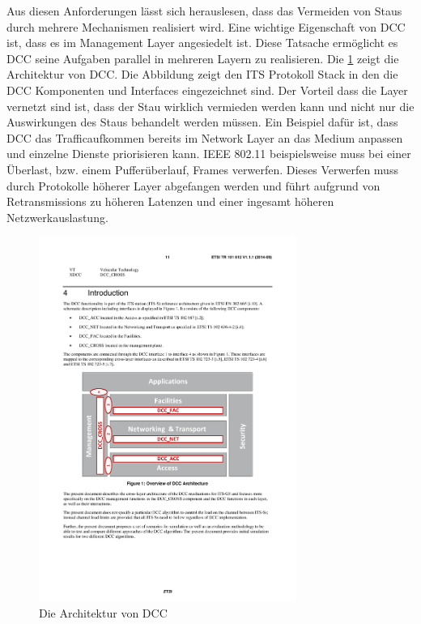 Aus diesen Anforderungen lässt sich herauslesen, dass das Vermeiden von Staus durch mehrere Mechanismen realisiert wird. Eine wichtige Eigenschaft von \ac{DCC} ist, dass es im Management Layer angesiedelt ist. Diese Tatsache ermöglicht es \ac{DCC} seine Aufgaben parallel in mehreren Layern zu realisieren. Die \ref{fig:architektur_dccArchitektur} zeigt die Architektur von \ac{DCC}. Die Abbildung zeigt den \ac{ITS} Protokoll Stack in den die \ac{DCC} Komponenten und Interfaces eingezeichnet sind. Der Vorteil dass die Layer vernetzt sind ist, dass der Stau wirklich vermieden werden kann und nicht nur die Auswirkungen des Staus behandelt werden müssen. Ein Beispiel dafür ist, dass \ac{DCC} das Trafficaufkommen bereits im Network Layer an das Medium anpassen und einzelne Dienste priorisieren kann. IEEE 802.11 beispielsweise muss bei einer Überlast, bzw. einem Pufferüberlauf, Frames verwerfen. Dieses Verwerfen muss durch Protokolle höherer Layer abgefangen werden und führt aufgrund von Retransmissions zu höheren Latenzen und einer ingesamt höheren Netzwerkauslastung. 

\begin{figure}
	\includegraphics[width=0.75\textwidth]{content/images/02_architektur/dccArchitektur.pdf}
	\caption{Die Architektur von DCC \cite{etsi102687}}
	\label{fig:architektur_dccArchitektur}
\end{figure}

